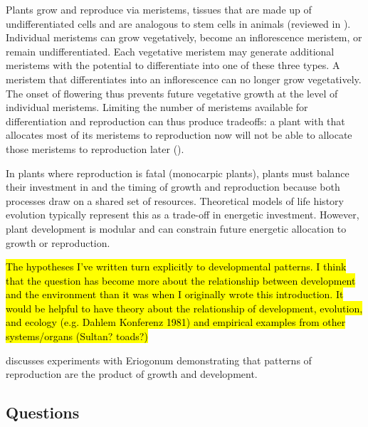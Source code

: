 \documentclass[12pt, oneside,titlepage]{article}   	%
\begin{document}
Plants grow and reproduce via meristems, tissues that are made up of undifferentiated cells and are analogous to stem cells in animals (reviewed in \cite{mcsteen2005,wang2018}). Individual meristems can grow vegetatively, become an inflorescence meristem, or remain undifferentiated. Each vegetative meristem may generate additional meristems with the potential to differentiate into one of these three types. A meristem that differentiates into an inflorescence can no longer grow vegetatively. The onset of flowering thus prevents future vegetative growth at the level of individual meristems. Limiting the number of meristems available for differentiation and reproduction can thus produce tradeoffs: a plant with that allocates most of its meristems to reproduction now will not be able to allocate those meristems to reproduction later (\cite{watson1984a,geber1990a}).

In plants where reproduction is fatal (monocarpic plants), plants must balance their investment in and the timing of growth and reproduction because both processes draw on a shared set of resources. Theoretical models of life history evolution typically represent this as a trade-off in energetic investment. However, plant development is modular and can constrain future energetic allocation to growth or reproduction.

\hl{The hypotheses I've written turn explicitly to developmental patterns. I think that the question has become more about the relationship between development and the environment than it was when I originally wrote this introduction. It would be helpful to have theory about the relationship of development, evolution, and ecology (e.g. Dahlem Konferenz 1981) and empirical examples from other systems/organs (Sultan? toads?)}

\cite{fox1990} discusses experiments with Eriogonum demonstrating that patterns of reproduction are the product of growth and development. 

\subsection{Questions}
\end{document}

